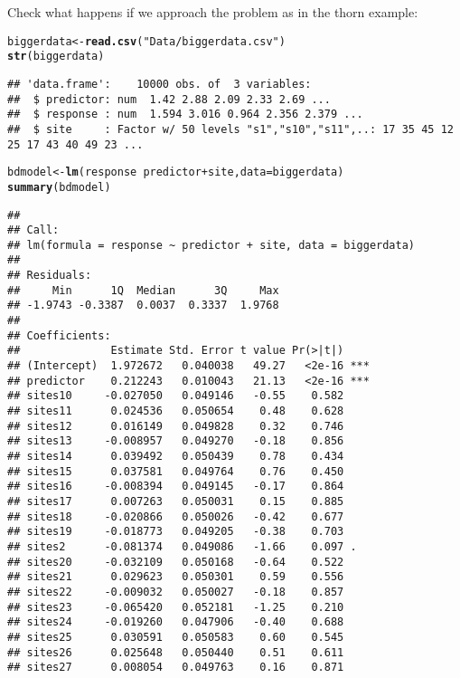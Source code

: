 \documentclass[12pt,a4paper]{scrartcl}\usepackage[]{graphicx}\usepackage[]{color}
\makeatletter
\newcommand{\hlstr}[1]{\textcolor[rgb]{0.192,0.494,0.8}{#1}}%
\newcommand{\hlopt}[1]{\textcolor[rgb]{0,0,0}{#1}}%
\newcommand{\hlstd}[1]{\textcolor[rgb]{0.345,0.345,0.345}{#1}}%
\newcommand{\hlkwb}[1]{\textcolor[rgb]{0.69,0.353,0.396}{#1}}%
\newcommand{\hlkwc}[1]{\textcolor[rgb]{0.333,0.667,0.333}{#1}}%
\newcommand{\hlkwd}[1]{\textcolor[rgb]{0.737,0.353,0.396}{\textbf{#1}}}%
\newenvironment{kframe}{%
 \def\at@end@of@kframe{}%
 \ifinner\ifhmode%
  \def\at@end@of@kframe{\end{minipage}}%
  \begin{minipage}{\columnwidth}%
 \fi\fi%
 \def\FrameCommand##1{\hskip\@totalleftmargin \hskip-\fboxsep
 \colorbox{shadecolor}{##1}\hskip-\fboxsep
     \hskip-\linewidth \hskip-\@totalleftmargin \hskip\columnwidth}%
 \MakeFramed {\advance\hsize-\width
   \@totalleftmargin\z@ \linewidth\hsize
   \@setminipage}}%
 {\par\unskip\endMakeFramed%
 \at@end@of@kframe}
\newenvironment{knitrout}{}{} %
\makeatother
\begin{document}
Check what happens if we approach the problem as in the thorn example:
\begin{knitrout}
\color{fgcolor}\begin{kframe}
\begin{alltt}
\hlstd{biggerdata} \hlkwb{<-} \hlkwd{read.csv}\hlstd{(}\hlstr{"Data/biggerdata.csv"}\hlstd{)}
\hlkwd{str}\hlstd{(biggerdata)}
\end{alltt}
\begin{verbatim}
## 'data.frame':	10000 obs. of  3 variables:
##  $ predictor: num  1.42 2.88 2.09 2.33 2.69 ...
##  $ response : num  1.594 3.016 0.964 2.356 2.379 ...
##  $ site     : Factor w/ 50 levels "s1","s10","s11",..: 17 35 45 12 25 17 43 40 49 23 ...
\end{verbatim}
\begin{alltt}
\hlstd{bdmodel} \hlkwb{<-} \hlkwd{lm}\hlstd{(response} \hlopt{~} \hlstd{predictor} \hlopt{+} \hlstd{site,} \hlkwc{data} \hlstd{= biggerdata)}
\hlkwd{summary}\hlstd{(bdmodel)}
\end{alltt}
\begin{verbatim}
## 
## Call:
## lm(formula = response ~ predictor + site, data = biggerdata)
## 
## Residuals:
##     Min      1Q  Median      3Q     Max 
## -1.9743 -0.3387  0.0037  0.3337  1.9768 
## 
## Coefficients:
##              Estimate Std. Error t value Pr(>|t|)    
## (Intercept)  1.972672   0.040038   49.27   <2e-16 ***
## predictor    0.212243   0.010043   21.13   <2e-16 ***
## sites10     -0.027050   0.049146   -0.55    0.582    
## sites11      0.024536   0.050654    0.48    0.628    
## sites12      0.016149   0.049828    0.32    0.746    
## sites13     -0.008957   0.049270   -0.18    0.856    
## sites14      0.039492   0.050439    0.78    0.434    
## sites15      0.037581   0.049764    0.76    0.450    
## sites16     -0.008394   0.049145   -0.17    0.864    
## sites17      0.007263   0.050031    0.15    0.885    
## sites18     -0.020866   0.050026   -0.42    0.677    
## sites19     -0.018773   0.049205   -0.38    0.703    
## sites2      -0.081374   0.049086   -1.66    0.097 .  
## sites20     -0.032109   0.050168   -0.64    0.522    
## sites21      0.029623   0.050301    0.59    0.556    
## sites22     -0.009032   0.050027   -0.18    0.857    
## sites23     -0.065420   0.052181   -1.25    0.210    
## sites24     -0.019260   0.047906   -0.40    0.688    
## sites25      0.030591   0.050583    0.60    0.545    
## sites26      0.025648   0.050440    0.51    0.611    
## sites27      0.008054   0.049763    0.16    0.871    

\end{verbatim}
\end{kframe}
\end{knitrout}
\end{document}
